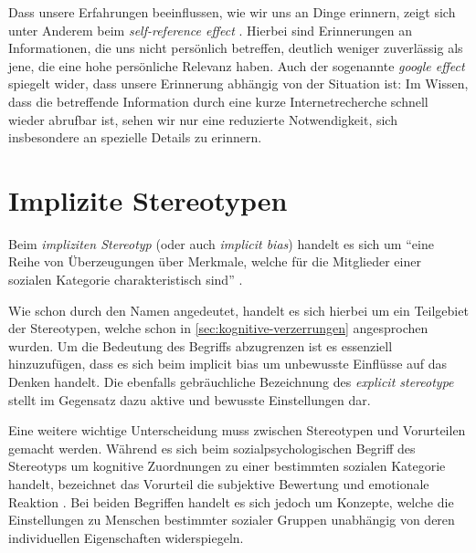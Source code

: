 \begin{enumerate}
	Dass unsere Erfahrungen beeinflussen, wie wir uns an Dinge erinnern, zeigt sich unter Anderem beim \emph{self-reference effect} \citep{rogers1977self}.
	Hierbei sind Erinnerungen an Informationen, die uns nicht persönlich betreffen, deutlich weniger zuverlässig als jene, die eine hohe persönliche Relevanz haben.
	Auch der sogenannte \emph{google effect} \citep{sparrow2011google} spiegelt wider, dass unsere Erinnerung abhängig von der Situation ist:
	Im Wissen, dass die betreffende Information durch eine kurze Internetrecherche schnell wieder abrufbar ist, 
	sehen wir nur eine reduzierte Notwendigkeit, sich insbesondere an spezielle Details zu erinnern.
\end{enumerate}


\section{Implizite Stereotypen}
\label{sec:implicit-bias}

Beim \emph{impliziten Stereotyp} (oder auch \emph{implicit bias}) handelt es sich um ``eine Reihe von Überzeugungen über Merkmale, welche für die Mitglieder einer sozialen Kategorie charakteristisch sind'' \citep[Übers. d. Verf.]{greenwald1995implicit}.

Wie schon durch den Namen angedeutet, handelt es sich hierbei um ein Teilgebiet der Stereotypen, welche schon in \autoref{sec:kognitive-verzerrungen} angesprochen wurden.
Um die Bedeutung des Begriffs abzugrenzen ist es essenziell hinzuzufügen, dass es sich beim implicit bias um unbewusste Einflüsse auf das Denken handelt.
Die ebenfalls gebräuchliche Bezeichnung des \emph{explicit stereotype} stellt im Gegensatz dazu aktive und bewusste Einstellungen dar.

Eine weitere wichtige Unterscheidung muss zwischen Stereotypen und Vorurteilen gemacht werden.
Während es sich beim sozialpsychologischen Begriff des Stereotyps um kognitive Zuordnungen zu einer bestimmten sozialen Kategorie handelt, bezeichnet das Vorurteil die subjektive Bewertung und emotionale Reaktion \citep{degner2022vorurteile}.
Bei beiden Begriffen handelt es sich jedoch um Konzepte, welche die Einstellungen zu Menschen bestimmter sozialer Gruppen unabhängig von deren individuellen Eigenschaften widerspiegeln.

